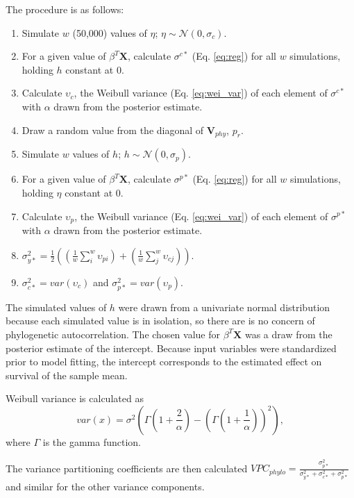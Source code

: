 \documentclass[12pt,letterpaper]{article}
\begin{document}
The procedure is as follows:
\begin{enumerate}
  \item Simulate \(w\) (50,000) values of \(\eta\); \(\eta \sim \mathcal{N}(0, \sigma_{c})\).
  \item For a given value of \(\beta^{T} \mathbf{X}\), calculate \(\sigma^{c*}\) (Eq. \ref{eq:reg}) for all \(w\) simulations, holding \(h\) constant at 0.
  \item Calculate \(\upsilon_{c}\), the Weibull variance (Eq. \ref{eq:wei_var}) of each element of \(\sigma^{c*}\) with \(\alpha\) drawn from the posterior estimate.
  \item Draw a random value from the diagonal of \(\mathbf{V}_{phy}\), \(p_{r}\).
  \item Simulate \(w\) values of \(h\); \(h \sim \mathcal{N}(0, \sigma_{p})\). 
  \item For a given value of \(\beta^{T} \mathbf{X}\), calculate \(\sigma^{p*}\) (Eq. \ref{eq:reg}) for all \(w\) simulations, holding \(\eta\) constant at 0.
  \item Calculate \(\upsilon_{p}\), the Weibull variance (Eq. \ref{eq:wei_var}) of each element of \(\sigma^{p*}\) with \(\alpha\) drawn from the posterior estimate.
  \item \(\sigma_{y*}^{2} = \frac{1}{2} \left(\left(\frac{1}{w} \sum_{i}^{w} \upsilon_{pi}\right) + \left(\frac{1}{w} \sum_{j}^{w} \upsilon_{cj}\right)\right)\).
  \item \(\sigma_{c*}^{2} = var(\upsilon_{c})\) and \(\sigma_{p*}^{2} = var(\upsilon_{p})\).
\end{enumerate}

The simulated values of \(h\) were drawn from a univariate normal distribution because each simulated value is in isolation, so there are is no concern of phylogenetic autocorrelation. The chosen value for \(\beta^{T} \mathbf{X}\) was a draw from the posterior estimate of the intercept. Because input variables were standardized prior to model fitting, the intercept corresponds to the estimated effect on survival of the sample mean.

Weibull variance is calculated as
\begin{equation}
  var(x) = \sigma^{2}\left(\Gamma\left(1 + \frac{2}{\alpha}\right) - \left(\Gamma\left(1 + \frac{1}{\alpha}\right)\right)^{2}\right),
  \label{eq:wei_var}
\end{equation}
where \(\Gamma\) is the gamma function. 

The variance partitioning coefficients are then calculated \(VPC_{phylo} = \frac{\sigma_{p*}^{2}}{\sigma_{y*}^{2} + \sigma_{c*}^{2} + \sigma_{p*}^{2}}\) and similar for the other variance components.
\end{document}
